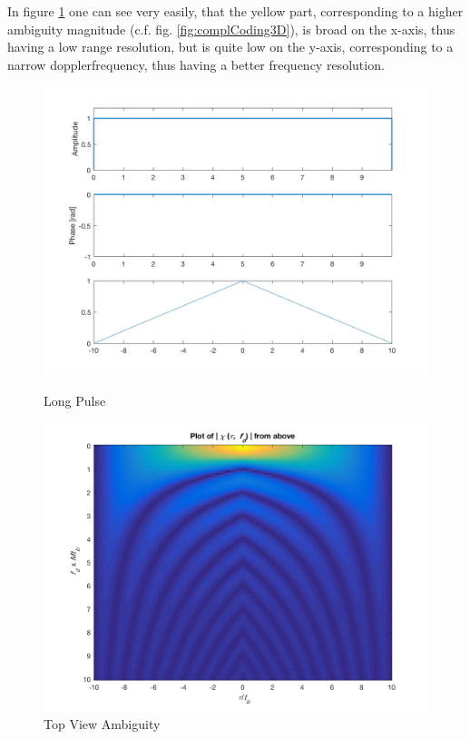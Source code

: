 In figure \ref{fig:longTop} one can see very easily, that the yellow part, corresponding to a higher ambiguity magnitude (c.f. fig. \ref{fig:complCoding3D}), is broad on the x-axis, thus having a low range resolution, but is quite low on the y-axis, corresponding to a narrow dopplerfrequency, thus having a better frequency resolution.


\begin{figure}[!htbp]
  \centering
  \begin{minipage}[b]{0.45\textwidth}
    \includegraphics[width=\textwidth]{images/long_props}
    \caption{Long Pulse}
    \label{fig:longProps}
  \end{minipage}
  \hfill
  \begin{minipage}[b]{0.45\textwidth}
    \includegraphics[width=\textwidth]{images/long_top}
    \caption{Top View Ambiguity}
    \label{fig:longTop}
  \end{minipage}
\end{figure}




